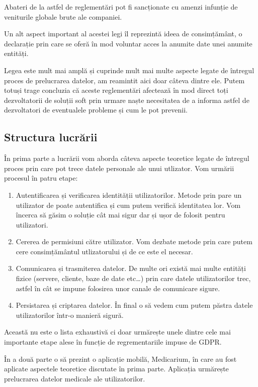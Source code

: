 \documentclass[12pt]{article}
\begin{document}
Abateri de la astfel de reglementări pot fi sancționate cu amenzi infunție de
veniturile globale brute ale companiei.

Un alt aspect important al acestei legi îl reprezintă ideea de consimțământ, o declarație prin care
se oferă în mod voluntar acces la anumite date unei anumite entități. 

Legea este mult mai amplă și cuprinde mult mai multe aspecte legate de întregul proces
de prelucrarea datelor, am reamintit aici doar câteva dintre ele. 
Putem totuși trage concluzia că aceste reglementări afectează în mod direct toți
dezvoltatorii de soluții soft prin urmare naște necesitatea de a informa astfel de
dezvoltatori de eventualele probleme și cum le pot prevenii.

\newpage
\subsection{Structura lucrării}

În prima parte a lucrării vom aborda câteva aspecte teoretice legate de întregul proces
prin care pot trece datele personale ale unui utlizator.
Vom urmării procesul în patru etape:

\begin{enumerate}
    \item Autentificarea și verificarea identității utilizatorilor. Metode prin pare un utilizator 
    de poate autentifica și cum putem verifică
    identitatea lor. Vom încerca să găsim o soluție cât mai sigur dar și ușor de
    folosit pentru utilizatori.
    \item Cererea de permisiuni către utilizator. Vom dezbate metode prin
    care putem cere consimțământul utlizatorului și de ce este el necesar.
    \item Comunicarea și trasmiterea datelor. De multe ori există mai multe entități fizice 
    (servere, cliente, baze de date etc\dots) prin care datele utilizatorilor trec, 
    astfel în cât se impune folosirea unor canale de comunicare sigure.
    \item Persistarea și criptarea datelor. În final o să vedem cum putem păstra
    datele utilizatorilor într-o manieră sigură.  
\end{enumerate}

Această nu este o lista exhaustivă ci doar urmărește unele dintre cele mai importante 
etape alese în funcție de regrementariile impuse de GDPR. 

\bigskip

În a două parte o să prezint o aplicație mobilă, Medicarium, în care au fost aplicate
aspectele teoretice discutate în prima parte. Aplicația urmărește prelucrarea datelor
medicale ale utilizatorilor. 
\end{document}
